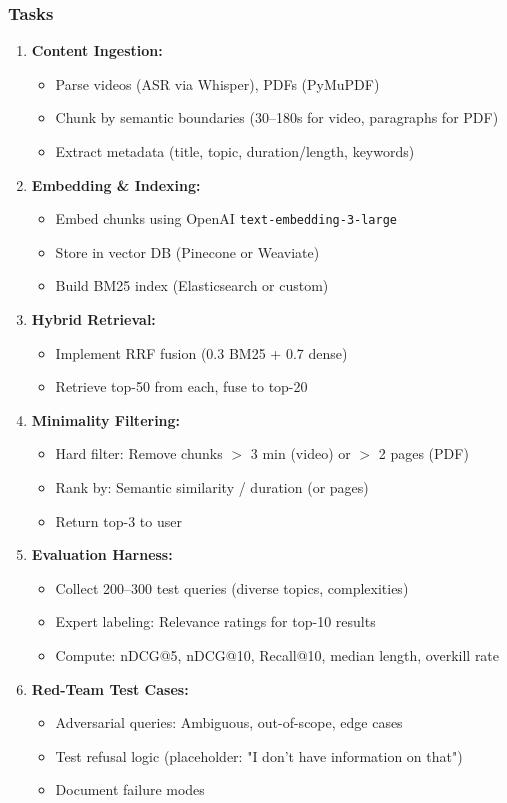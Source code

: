 \documentclass[11pt,letterpaper]{article}
\begin{document}
\subsubsection{Tasks}
\begin{enumerate}
\item \textbf{Content Ingestion:}
\begin{itemize}
\item Parse videos (ASR via Whisper), PDFs (PyMuPDF)
\item Chunk by semantic boundaries (30--180s for video, paragraphs for PDF)
\item Extract metadata (title, topic, duration/length, keywords)
\end{itemize}

\item \textbf{Embedding \& Indexing:}
\begin{itemize}
\item Embed chunks using OpenAI \texttt{text-embedding-3-large}
\item Store in vector DB (Pinecone or Weaviate)
\item Build BM25 index (Elasticsearch or custom)
\end{itemize}

\item \textbf{Hybrid Retrieval:}
\begin{itemize}
\item Implement RRF fusion (0.3 BM25 + 0.7 dense)
\item Retrieve top-50 from each, fuse to top-20
\end{itemize}

\item \textbf{Minimality Filtering:}
\begin{itemize}
\item Hard filter: Remove chunks $>$ 3 min (video) or $>$ 2 pages (PDF)
\item Rank by: Semantic similarity / duration (or pages)
\item Return top-3 to user
\end{itemize}

\item \textbf{Evaluation Harness:}
\begin{itemize}
\item Collect 200--300 test queries (diverse topics, complexities)
\item Expert labeling: Relevance ratings for top-10 results
\item Compute: nDCG@5, nDCG@10, Recall@10, median length, overkill rate
\end{itemize}

\item \textbf{Red-Team Test Cases:}
\begin{itemize}
\item Adversarial queries: Ambiguous, out-of-scope, edge cases
\item Test refusal logic (placeholder: "I don't have information on that")
\item Document failure modes
\end{itemize}
\end{enumerate}
\end{document}
